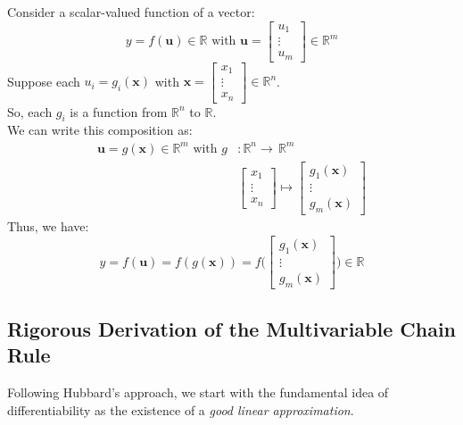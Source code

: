 \begin{notechapter}
Consider a scalar-valued function of a vector:
\begin{equation*}
    y = f(\mathbf{u}) \in \mathbb{R} \text{ with } \mathbf{u} =
    \begin{bmatrix}
        u_1 \\ \vdots \\ u_m
    \end{bmatrix}
    \in \mathbb{R}^{m}
\end{equation*}
Suppose each $u_{i} = g_i(\mathbf{x})$ with $\mathbf{x} = 
\begin{bmatrix}
        x_1 \\ \vdots \\ x_n
    \end{bmatrix}
\in \mathbb{R}^{n}$.\\
So, each $g_i$ is a function from $\mathbb{R}^{n}$ to $\mathbb{R}$.\\
We can write this composition as:
\begin{align*}
    \mathbf{u} = g(\mathbf{x}) \in \mathbb{R}^m \text{ with } g&\colon \mathbb{R}^{n} \longrightarrow \, \mathbb{R}^{m} \\
    &\begin{bmatrix}
        x_1 \\ \vdots \\ x_n
    \end{bmatrix}
    \mapsto
    \begin{bmatrix}
        g_1(\mathbf{x}) \\ \vdots \\ g_m(\mathbf{x})
    \end{bmatrix}
\end{align*}
Thus, we have:
\begin{equation}\label{chain-rule-to-bptt:eq:fog}
    y = f(\mathbf{u}) = f(g(\mathbf{x})) = f\Bigg(
        \begin{bmatrix}
            g_1(\mathbf{x}) \\ \vdots \\ g_m(\mathbf{x})
        \end{bmatrix}
        \Bigg)
        \in \mathbb{R}
\end{equation}

\subsection{Rigorous Derivation of the Multivariable Chain Rule}

Following Hubbard's approach, we start with the fundamental idea of
differentiability as the existence of a \textit{good linear approximation}.


\end{notechapter}
